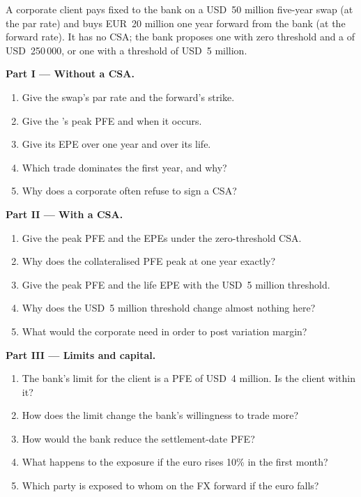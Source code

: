\begin{problem}\label{pb:rc:counterparty-exposure:1}
A corporate client pays fixed to the bank on a USD~50 million five-year swap (at the par rate)
and buys EUR~20 million one year forward from the bank (at the forward rate). It has no CSA;
the bank proposes one with zero threshold and a  of USD~250\,000, or
one with a threshold of USD~5 million.

\medskip\noindent\textbf{Part I --- Without a CSA.}
\begin{enumerate}
\item Give the swap's par rate and the forward's strike.
\item Give the 's peak PFE and when it occurs.
\item Give its EPE over one year and over its life.
\item Which trade dominates the first year, and why?
\item Why does a corporate often refuse to sign a CSA?
\end{enumerate}

\medskip\noindent\textbf{Part II --- With a CSA.}
\begin{enumerate}[resume]
\item Give the peak PFE and the EPEs under the zero-threshold CSA.
\item Why does the collateralised PFE peak at one year exactly?
\item Give the peak PFE and the life EPE with the USD~5 million threshold.
\item Why does the USD~5 million threshold change almost nothing here?
\item What would the corporate need in order to post variation margin?
\end{enumerate}

\medskip\noindent\textbf{Part III --- Limits and capital.}
\begin{enumerate}[resume]
\item The bank's limit for the client is a PFE of USD~4 million. Is the client within it?
\item How does the limit change the bank's willingness to trade more?
\item How would the bank reduce the settlement-date PFE?
\item What happens to the exposure if the euro rises 10\% in the first month?
\item Which party is exposed to whom on the FX forward if the euro falls?
\end{enumerate}


\end{problem}
